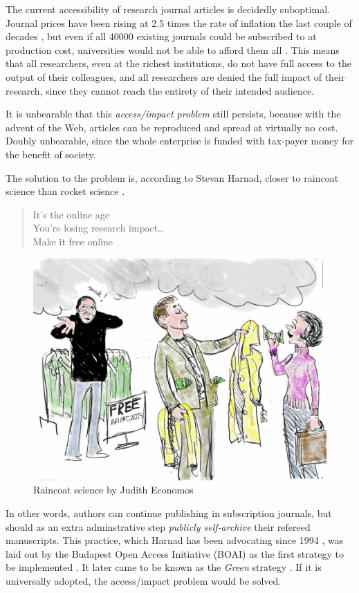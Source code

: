 \documentclass[11pt, openany, oneside, article, a4paper, twocolumn]{memoir}
\begin{document}
The current accessibility of research journal articles is decidedly
suboptimal. Journal prices have been rising at 2.5 times the rate of
inflation the last couple of decades \cite{monograph_serial_costs,
suber2008open}, but even if all 40000 existing journals could be
subscribed to at production cost, universities would not be able to afford
them all \cite{harnad2008access}. This means that all researchers, even at
the richest institutions, do not have full access to the output of their
colleagues, and all researchers are denied the full impact of their
research, since they cannot reach the entirety of their intended audience.

It is unbearable that this \emph{access/impact problem} still persists,
because with the advent of the Web, articles can be reproduced and spread
at virtually no cost. Doubly unbearable, since the whole enterprise is
funded with tax-payer money for the benefit of society. 

The solution to the problem is, according to Stevan Harnad, closer to
raincoat science than rocket science \cite{harnad_raincoat}.

\blockquote{%
It's the online age\\
You're losing research impact\dots \\
Make it free online}

\begin{figure}
  \includegraphics[width=\columnwidth]{rain4.jpg}
  \caption{Raincoat science by Judith Economos}
\end{figure}

In other words, authors can continue publishing in subscription journals,
but should as an extra adminstrative step \emph{publicly self-archive}
their refereed manuscripts. This practice, which Harnad has been
advocating since 1994 \cite{harnad1995subversive}, was laid out by the
Budapest Open Access Initiative (BOAI) as the first strategy to be
implemented \cite{boai}. It later came to be known as the \emph{Green}
strategy \cite{harnad2004access}. If it is universally adopted, the
access/impact problem would be solved.
\end{document}
